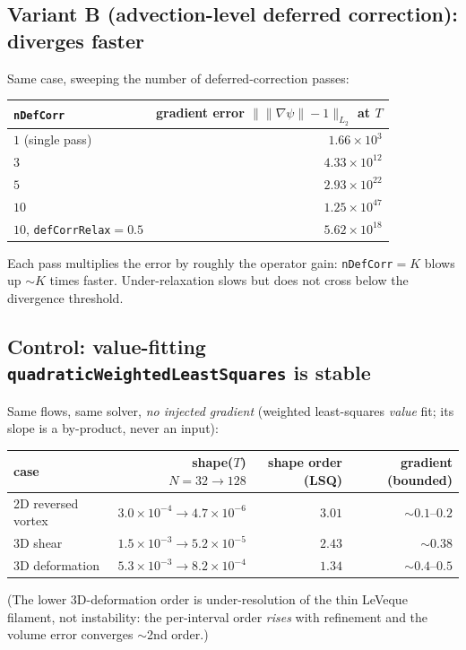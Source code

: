 \documentclass[11pt]{article}
\newcommand{\gradpsi}{\lVert\nabla\psi\rVert}
\newcommand{\code}[1]{\texttt{#1}}
\begin{document}
\subsection{Variant B (advection-level deferred correction): diverges faster}
Same case, sweeping the number of deferred-correction passes:
\begin{center}
\begin{tabular}{l r}
\toprule
\code{nDefCorr} & gradient error $\lVert\gradpsi-1\rVert_{L_2}$ at $T$ \\
\midrule
$1$ (single pass)             & $1.66\!\times\!10^{3}$ \\
$3$                           & $4.33\!\times\!10^{12}$ \\
$5$                           & $2.93\!\times\!10^{22}$ \\
$10$                          & $1.25\!\times\!10^{47}$ \\
$10$, \code{defCorrRelax}$=0.5$ & $5.62\!\times\!10^{18}$ \\
\bottomrule
\end{tabular}
\end{center}
Each pass multiplies the error by roughly the operator gain: \code{nDefCorr}$=K$
blows up ${\sim}K$ times faster. Under-relaxation slows but does not cross below the
divergence threshold.

\subsection{Control: value-fitting \code{quadraticWeightedLeastSquares} is stable}
Same flows, same solver, \emph{no injected gradient} (weighted least-squares
\emph{value} fit; its slope is a by-product, never an input):
\begin{center}
\begin{tabular}{l r r r}
\toprule
case & shape($T$) $N{=}32\!\to\!128$ & shape order (LSQ) & gradient (bounded) \\
\midrule
2D reversed vortex & $3.0\!\times\!10^{-4}\!\to\!4.7\!\times\!10^{-6}$ & $3.01$ & ${\sim}0.1$--$0.2$ \\
3D shear           & $1.5\!\times\!10^{-3}\!\to\!5.2\!\times\!10^{-5}$ & $2.43$ & ${\sim}0.38$ \\
3D deformation     & $5.3\!\times\!10^{-3}\!\to\!8.2\!\times\!10^{-4}$ & $1.34$ & ${\sim}0.4$--$0.5$ \\
\bottomrule
\end{tabular}
\end{center}
(The lower 3D-deformation order is under-resolution of the thin LeVeque filament,
not instability: the per-interval order \emph{rises} with refinement and the volume
error converges $\sim$2nd order.)
\end{document}
